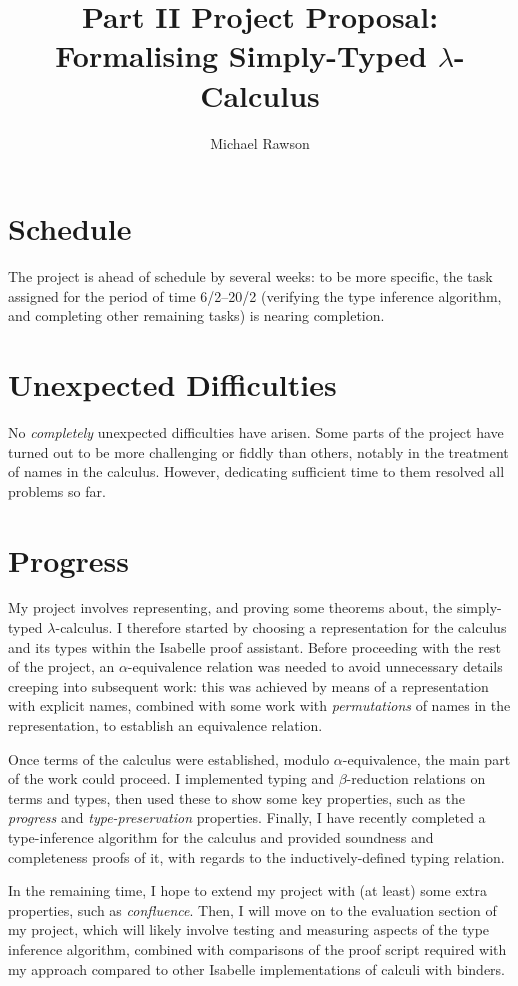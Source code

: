 \documentclass[12pt]{article}
\title{Part II Project Proposal: Formalising Simply-Typed \(\lambda\)-Calculus}
\author{Michael Rawson}
\begin{document}

\section*{Schedule}
The project is ahead of schedule by several weeks: to be more specific, the task assigned for the period of time 6/2--20/2 (verifying the type inference algorithm, and completing other remaining tasks) is nearing completion.

\section*{Unexpected Difficulties}
No \emph{completely} unexpected difficulties have arisen.
Some parts of the project have turned out to be more challenging or fiddly than others, notably in the treatment of names in the calculus.
However, dedicating sufficient time to them resolved all problems so far.

\section*{Progress}
My project involves representing, and proving some theorems about, the simply-typed $\lambda$-calculus.
I therefore started by choosing a representation for the calculus and its types within the Isabelle proof assistant.
Before proceeding with the rest of the project, an $\alpha$-equivalence relation was needed to avoid unnecessary details creeping into subsequent work: this was achieved by means of a representation with explicit names, combined with some work with \emph{permutations} of names in the representation, to establish an equivalence relation.

Once terms of the calculus were established, modulo $\alpha$-equivalence, the main part of the work could proceed.
I implemented typing and $\beta$-reduction relations on terms and types, then used these to show some key properties, such as the \emph{progress} and \emph{type-preservation} properties.
Finally, I have recently completed a type-inference algorithm for the calculus and provided soundness and completeness proofs of it, with regards to the inductively-defined typing relation.

In the remaining time, I hope to extend my project with (at least) some extra properties, such as \emph{confluence}.
Then, I will move on to the evaluation section of my project, which will likely involve testing and measuring aspects of the type inference algorithm, combined with comparisons of the proof script required with my approach compared to other Isabelle implementations of calculi with binders.
\end{document}
